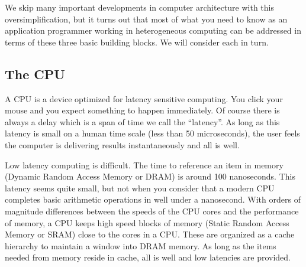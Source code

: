 We skip many important developments in computer architecture with this oversimplification, but 
it turns out that most of what you need to know as an application programmer working in 
heterogeneous computing can be addressed in terms of these three basic building blocks.
We will consider each in turn.

\subsection{The CPU}


A CPU is a device optimized for latency sensitive computing.  You click your mouse and you expect something to happen
immediately.  Of course there is always a delay which is a span of time we call the ``latency''.  As long as this
latency is small on a human time scale (less than 50 microseconds), the user feels the computer is delivering results
instantaneously and  all is well.  

Low latency computing is difficult.  The time to reference an item in memory (Dynamic Random Access Memory or DRAM) is around 100 nanoseconds.  This latency
seems quite small, but not when you consider that a modern CPU completes basic arithmetic operations in well
under a nanosecond.  With orders of magnitude differences between the speeds of the CPU cores and the performance
of memory, a CPU keeps high speed blocks of memory (Static Random Access Memory or SRAM) close to the cores in a CPU.  These are organized as a 
cache hierarchy to maintain a window into DRAM memory.  As long as the items needed from memory 
reside in cache, all is well and low latencies are provided.  

